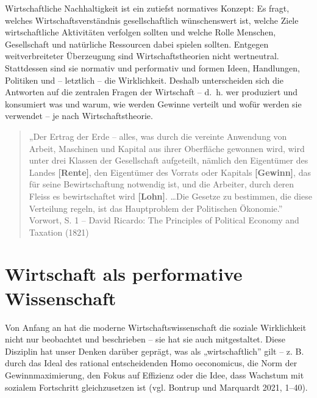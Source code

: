 \documentclass[
  nswissgerman,
  a4paper,
  openany]{book}
\begin{document}
Wirtschaftliche Nachhaltigkeit ist ein zutiefst normatives Konzept: Es
fragt, welches Wirtschaftsverständnis gesellschaftlich wünschenswert
ist, welche Ziele wirtschaftliche Aktivitäten verfolgen sollten und
welche Rolle Menschen, Gesellschaft und natürliche Ressourcen dabei
spielen sollten. Entgegen weitverbreiteter Überzeugung sind
Wirtschaftstheorien nicht wertneutral. Stattdessen sind sie normativ und
performativ und formen Ideen, Handlungen, Politiken und -- letztlich --
die Wirklichkeit. Deshalb unterscheiden sich die Antworten auf die
zentralen Fragen der Wirtschaft -- d.~h. wer produziert und konsumiert
was und warum, wie werden Gewinne verteilt und wofür werden sie
verwendet -- je nach Wirtschaftstheorie.

\begin{tcolorbox}[enhanced jigsaw, arc=.35mm, bottomrule=.15mm, bottomtitle=1mm, breakable, colback=white, colbacktitle=quarto-callout-note-color!10!white, colframe=quarto-callout-note-color-frame, coltitle=black, left=2mm, leftrule=.75mm, opacityback=0, opacitybacktitle=0.6, rightrule=.15mm, title={Definition von Rente, Gewinn und Lohn}, titlerule=0mm, toprule=.15mm, toptitle=1mm]

\begin{quote}
„Der Ertrag der Erde -- alles, was durch die vereinte Anwendung von
Arbeit, Maschinen und Kapital aus ihrer Oberfläche gewonnen wird, wird
unter drei Klassen der Gesellschaft aufgeteilt, nämlich den Eigentümer
des Landes \textbf{{[}Rente{]}}, den Eigentümer des Vorrats oder
Kapitals \textbf{{[}Gewinn{]}}, das für seine Bewirtschaftung notwendig
ist, und die Arbeiter, durch deren Fleiss es bewirtschaftet wird
\textbf{{[}Lohn{]}}. \ldots Die Gesetze zu bestimmen, die diese
Verteilung regeln, ist das Hauptproblem der Politischen Ökonomie.''\\
Vorwort, S. 1 -- David Ricardo: The Principles of Political Economy and
Taxation (1821)
\end{quote}

\end{tcolorbox}

\section{Wirtschaft als performative
Wissenschaft}\label{wirtschaft-als-performative-wissenschaft}

Von Anfang an hat die moderne Wirtschaftswissenschaft die soziale
Wirklichkeit nicht nur beobachtet und beschrieben -- sie hat sie auch
mitgestaltet. Diese Disziplin hat unser Denken darüber geprägt, was als
„wirtschaftlich'' gilt -- z. B. durch das Ideal des rational
entscheidenden Homo oeconomicus, die Norm der Gewinnmaximierung, den
Fokus auf Effizienz oder die Idee, dass Wachstum mit sozialem
Fortschritt gleichzusetzen ist (vgl. Bontrup und Marquardt 2021, 1--40).
\end{document}

